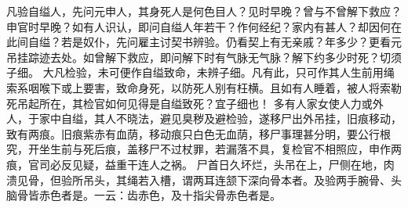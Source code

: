 \documentclass[12pt,UTF8]{ctexbook}
\begin{document}
凡验自缢人，先问元申人，其身死人是何色目人？见时早晚？曾与不曾解下救应？申官时早晚？如有人识认，即问自缢人年若干？作何经纪？家内有甚人？却因何在此间自缢？若是奴仆，先问雇主讨契书辨验。仍看契上有无亲戚？年多少？更看元吊挂踪迹去处。如曾解下救应，即问解下时有气脉无气脉？解下约多少时死？切须子细。
大凡检验，未可便作自缢致命，未辨子细。凡有此，只可作其人生前用绳索系咽喉下或上要害，致命身死，以防死人别有枉横。且如有人睡着，被人将索勒死吊起所在，其检官如何见得是自缢致死？宜子细也！
多有人家女使人力或外人，于家中自缢，其人不晓法，避见臭秽及避检验，遂移尸出外吊挂，旧痕移动，致有两痕。旧痕紫赤有血荫，移动痕只白色无血荫，移尸事理甚分明，要公行根究，开坐生前与死后痕，盖移尸不过杖罪，若漏落不具，复检官不相照应，申作两痕，官司必反见疑，益重干连人之祸。
尸首日久坏烂，头吊在上，尸侧在地，肉溃见骨，但验所吊头，其绳若入槽，谓两耳连颔下深向骨本者。及验两手腕骨、头脑骨皆赤色者是。一云：齿赤色，及十指尖骨赤色者是。
\end{document}
